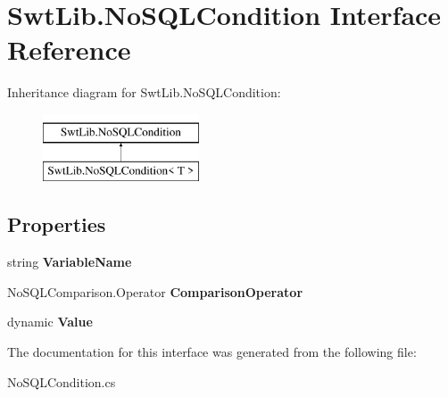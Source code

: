 \hypertarget{interface_swt_lib_1_1_no_s_q_l_condition}{\section{Swt\-Lib.\-No\-S\-Q\-L\-Condition Interface Reference}
\label{interface_swt_lib_1_1_no_s_q_l_condition}
}
Inheritance diagram for Swt\-Lib.\-No\-S\-Q\-L\-Condition\-:\begin{figure}[H]
\begin{center}
\leavevmode
\includegraphics[height=2.000000cm]{interface_swt_lib_1_1_no_s_q_l_condition}
\end{center}
\end{figure}
\subsection*{Properties}
\begin{DoxyCompactItemize}
\item 
\hypertarget{interface_swt_lib_1_1_no_s_q_l_condition_a2967e236c0a99ce54c11febe46d3b05a}{string {\bfseries Variable\-Name}}\label{interface_swt_lib_1_1_no_s_q_l_condition_a2967e236c0a99ce54c11febe46d3b05a}

\item 
\hypertarget{interface_swt_lib_1_1_no_s_q_l_condition_a7d1a71fc8c5d277aca90cac92c37408a}{No\-S\-Q\-L\-Comparison.\-Operator {\bfseries Comparison\-Operator}}\label{interface_swt_lib_1_1_no_s_q_l_condition_a7d1a71fc8c5d277aca90cac92c37408a}

\item 
\hypertarget{interface_swt_lib_1_1_no_s_q_l_condition_acdcc93815218d406524db265d82fb74e}{dynamic {\bfseries Value}}\label{interface_swt_lib_1_1_no_s_q_l_condition_acdcc93815218d406524db265d82fb74e}

\end{DoxyCompactItemize}


The documentation for this interface was generated from the following file\-:\begin{DoxyCompactItemize}
\item 
No\-S\-Q\-L\-Condition.\-cs\end{DoxyCompactItemize}
